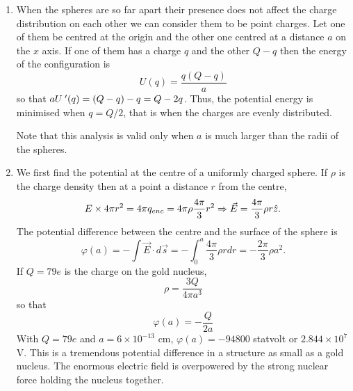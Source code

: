 \documentclass{article}
\begin{document}
\begin{enumerate}
\begin{verbatim}
a = 1
b = 1
sigma = 4/np.pi # Chosen so that 4\pi\sigma a = 1 !!
K = 4*np.pi*sigma*a

def E_field(z: float) -> float:
    return K*((4*a**2+(b-2*z)**2)**(-1/2)+\
              (4*a**2+(b+2*z)**2)**(-1/2))

def main():
    Z = np.linspace(-4*b, 4*b, 200)
    E = [E_field(z) for z in Z]
    plt.plot(Z, E)
    plt.axvline(x=-b/2, ls='--')
    plt.axvline(x=b/2, ls='--')
    plt.xlabel(r'$z$')
    plt.ylabel(r'$E(z)$')
    plt.title('Electric field in a charged cylinder')
    plt.savefig('course/purcell_c2p18.png')


if __name__ == '__main__':
    main()
\end{verbatim}
\begin{figure}[!ht]
\center
\texttt{[image: purcell\_c2p18]}
\caption{$E(z)$ for $a=1, b=1$. The cylinder extends from $z=-1/2$ to $z=1/2$.}
\label{c2f18}
\end{figure}

\item When the spheres are so far apart their presence does not affect the charge
distribution on each other we can consider them to be point charges. Let one of 
them be centred at the origin and the other one centred at a distance $a$ on the
$x$ axis. If one of them has a charge $q$ and the other $Q-q$ then the energy of
the configuration is
\[
U(q) = \frac{q(Q - q)}{a}
\]
so that $aU^{\;\prime}(q) = (Q - q) - q = Q - 2q$. Thus, the potential energy is minimised
when $q = Q/2$, that is when the charges are evenly distributed.

Note that this analysis is valid only when $a$ is much larger than the radii of the
spheres.

\item We first find the potential at the centre of a uniformly charged sphere.
If $\rho$ is the charge density then at a point a distance $r$ from the centre,
\[
E \times 4\pi r^2 = 4\pi q_{enc} = 4\pi\rho\frac{4\pi}{3}r^2 \Rightarrow
\vec{E} = \frac{4\pi}{3}\rho r\hat{z}.
\]
The potential difference between the centre and the surface of the sphere is
\[
\varphi(a) = -\int\vec{E}\cdot d\vec{s} = -\int_0^a \frac{4\pi}{3}\rho rdr
= -\frac{2\pi}{3}\rho a^2.
\]
If $Q = 79e$ is the charge on the gold nucleus,
\[
\rho = \frac{3Q}{4\pi a^3}
\]
so that
\[
\varphi(a) = -\frac{Q}{2a}
\]
With $Q = 79e$ and $a = 6 \times 10^{-13}$ cm, $\varphi(a) = -94 800$ statvolt or
$2.844 \times 10^{7}$ V. This is a tremendous potential difference in a structure
as small as a gold nucleus. The enormous electric field is overpowered by the
strong nuclear force holding the nucleus together.


\end{enumerate}
\end{document}
